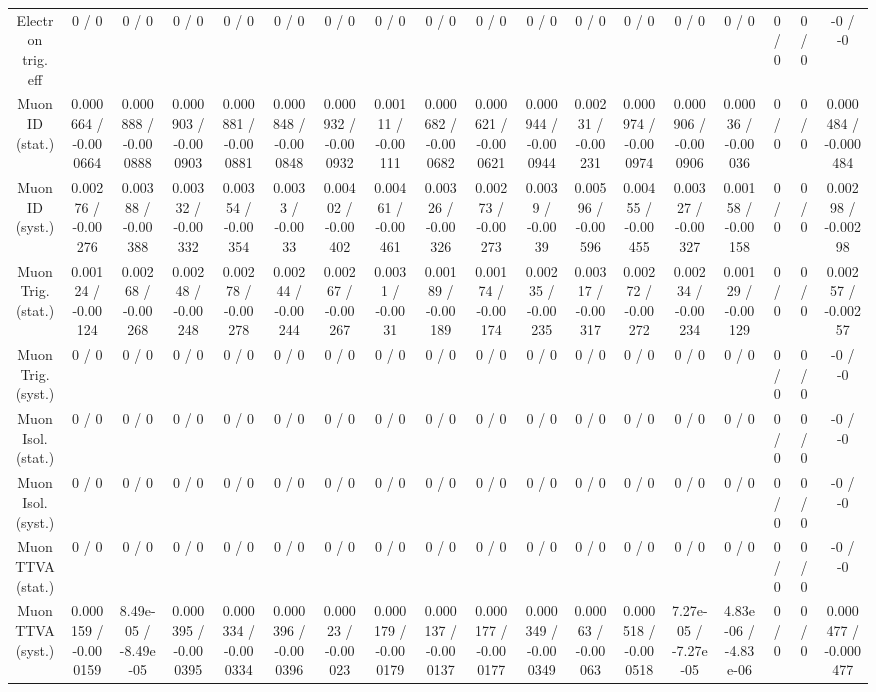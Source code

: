 \documentclass[10pt]{article}
\begin{document}
\begin{table}[htbp]
\begin{center}
\begin{tabular}{|c|c|c|c|c|c|c|c|c|c|c|c|c|c|c|c|c|c|}
  Electron trig. eff & 0 / 0 & 0 / 0 & 0 / 0 & 0 / 0 & 0 / 0 & 0 / 0 & 0 / 0 & 0 / 0 & 0 / 0 & 0 / 0 & 0 / 0 & 0 / 0 & 0 / 0 & 0 / 0 & 0 / 0 & 0 / 0 & -0 / -0 \\ 
  Muon ID (stat.) & 0.000664 / -0.000664 & 0.000888 / -0.000888 & 0.000903 / -0.000903 & 0.000881 / -0.000881 & 0.000848 / -0.000848 & 0.000932 / -0.000932 & 0.00111 / -0.00111 & 0.000682 / -0.000682 & 0.000621 / -0.000621 & 0.000944 / -0.000944 & 0.00231 / -0.00231 & 0.000974 / -0.000974 & 0.000906 / -0.000906 & 0.00036 / -0.00036 & 0 / 0 & 0 / 0 & 0.000484 / -0.000484 \\ 
  Muon ID (syst.) & 0.00276 / -0.00276 & 0.00388 / -0.00388 & 0.00332 / -0.00332 & 0.00354 / -0.00354 & 0.0033 / -0.0033 & 0.00402 / -0.00402 & 0.00461 / -0.00461 & 0.00326 / -0.00326 & 0.00273 / -0.00273 & 0.0039 / -0.0039 & 0.00596 / -0.00596 & 0.00455 / -0.00455 & 0.00327 / -0.00327 & 0.00158 / -0.00158 & 0 / 0 & 0 / 0 & 0.00298 / -0.00298 \\ 
  Muon Trig. (stat.) & 0.00124 / -0.00124 & 0.00268 / -0.00268 & 0.00248 / -0.00248 & 0.00278 / -0.00278 & 0.00244 / -0.00244 & 0.00267 / -0.00267 & 0.0031 / -0.0031 & 0.00189 / -0.00189 & 0.00174 / -0.00174 & 0.00235 / -0.00235 & 0.00317 / -0.00317 & 0.00272 / -0.00272 & 0.00234 / -0.00234 & 0.00129 / -0.00129 & 0 / 0 & 0 / 0 & 0.00257 / -0.00257 \\ 
  Muon Trig. (syst.) & 0 / 0 & 0 / 0 & 0 / 0 & 0 / 0 & 0 / 0 & 0 / 0 & 0 / 0 & 0 / 0 & 0 / 0 & 0 / 0 & 0 / 0 & 0 / 0 & 0 / 0 & 0 / 0 & 0 / 0 & 0 / 0 & -0 / -0 \\ 
  Muon Isol. (stat.) & 0 / 0 & 0 / 0 & 0 / 0 & 0 / 0 & 0 / 0 & 0 / 0 & 0 / 0 & 0 / 0 & 0 / 0 & 0 / 0 & 0 / 0 & 0 / 0 & 0 / 0 & 0 / 0 & 0 / 0 & 0 / 0 & -0 / -0 \\ 
  Muon Isol. (syst.) & 0 / 0 & 0 / 0 & 0 / 0 & 0 / 0 & 0 / 0 & 0 / 0 & 0 / 0 & 0 / 0 & 0 / 0 & 0 / 0 & 0 / 0 & 0 / 0 & 0 / 0 & 0 / 0 & 0 / 0 & 0 / 0 & -0 / -0 \\ 
  Muon TTVA (stat.) & 0 / 0 & 0 / 0 & 0 / 0 & 0 / 0 & 0 / 0 & 0 / 0 & 0 / 0 & 0 / 0 & 0 / 0 & 0 / 0 & 0 / 0 & 0 / 0 & 0 / 0 & 0 / 0 & 0 / 0 & 0 / 0 & -0 / -0 \\ 
  Muon TTVA (syst.) & 0.000159 / -0.000159 & 8.49e-05 / -8.49e-05 & 0.000395 / -0.000395 & 0.000334 / -0.000334 & 0.000396 / -0.000396 & 0.00023 / -0.00023 & 0.000179 / -0.000179 & 0.000137 / -0.000137 & 0.000177 / -0.000177 & 0.000349 / -0.000349 & 0.00063 / -0.00063 & 0.000518 / -0.000518 & 7.27e-05 / -7.27e-05 & 4.83e-06 / -4.83e-06 & 0 / 0 & 0 / 0 & 0.000477 / -0.000477 \\ 

\end{tabular}
\end{center}
\end{table}
\end{document}
